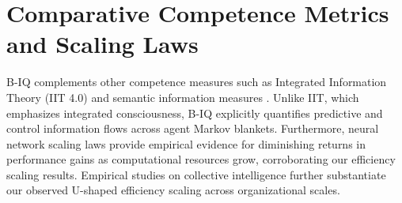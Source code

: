 \documentclass[10pt,conference]{IEEEtran}
\begin{document}
\section{Comparative Competence Metrics and Scaling Laws}
B-IQ complements other competence measures such as Integrated Information Theory (IIT 4.0) \cite{albantakis2023integrated} and semantic information measures \cite{kolchinsky2018semantic}. Unlike IIT, which emphasizes integrated consciousness, B-IQ explicitly quantifies predictive and control information flows across agent Markov blankets. Furthermore, neural network scaling laws \cite{kaplan2020scaling} provide empirical evidence for diminishing returns in performance gains as computational resources grow, corroborating our efficiency scaling results. Empirical studies on collective intelligence \cite{woolley2010evidence} further substantiate our observed U-shaped efficiency scaling across organizational scales.



\end{document}
